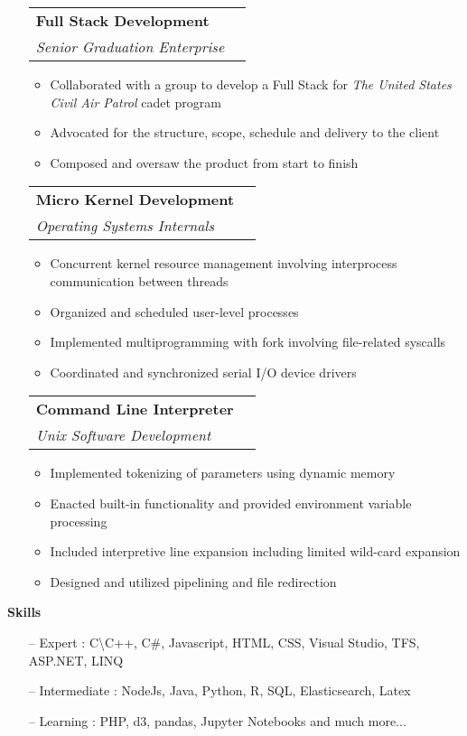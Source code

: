 \documentclass[letterpaper,11pt]{article}
\makeatletter
\newcommand{\resitem}[1]{\item #1 \vspace{-2pt}}
\newcommand{\resheading}[1]{{\large \colorbox{mygrey}{\begin{minipage}{\textwidth}{\textbf{#1 \vphantom{p\^{E}}}}\end{minipage}}}}
\newcommand{\ressubheading}[4]{
\begin{tabular*}{7.0in}{l@{\extracolsep{\fill}}r}
		\textbf{#1} & #2 \\
		\textit{#3} & \textit{#4} \\
\end{tabular*}\vspace{-6pt}}
\makeatother
\begin{document}
\begin{itemize}
\item[]
	\ressubheading{Full Stack Development}{}{Senior Graduation Enterprise}{}
	\begin{itemize}
		\resitem{Collaborated with a group to develop a Full Stack for \emph{The United States Civil Air Patrol} cadet program}
		\resitem{Advocated for the structure, scope, schedule and delivery to the client}
		\resitem{Composed and oversaw the product from start to finish}
	\end{itemize}
\item[]
	\ressubheading{Micro Kernel Development}{}{Operating Systems Internals}{}
	\begin{itemize}
		\resitem{Concurrent kernel resource management involving interprocess communication between threads}
		\resitem{Organized and scheduled user-level processes}
		\resitem{Implemented multiprogramming with fork involving file-related syscalls}
		\resitem{Coordinated and synchronized serial I/O device drivers}
	\end{itemize}
\item[]
	\ressubheading{Command Line Interpreter}{}{Unix Software Development}{}
	\begin{itemize}
		\resitem{Implemented tokenizing of parameters using dynamic memory}
		\resitem{Enacted built-in functionality and provided environment variable processing}
		\resitem{Included interpretive line expansion including limited wild-card expansion}
		\resitem{Designed and utilized pipelining and file redirection}
	\end{itemize}
\end{itemize}
\resheading{Skills}
\begin{itemize}
\item[--] Expert : C\textbackslash C++, C\#, Javascript, HTML, CSS, Visual Studio, TFS, ASP.NET, LINQ\\
\item[--] Intermediate : NodeJs, Java, Python, R, SQL, Elasticsearch, Latex\\
\item[--] Learning : PHP, d3, pandas, Jupyter Notebooks and much more...
\end{itemize}
\end{document}
